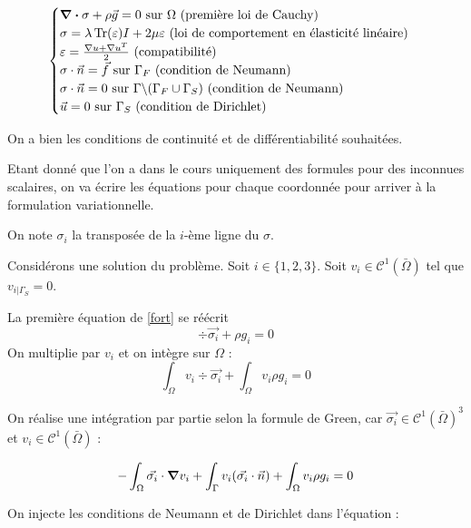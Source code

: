 \begin{equation}\label{fort}
    \begin{cases}
      \div \sigma + \rho \vec{g} = 0 \textrm { sur $\Omega$ (première loi de Cauchy)} \\
      \sigma = \lambda \operatorname{Tr} (\varepsilon) I + 2 \mu \varepsilon \textrm { (loi de comportement en élasticité linéaire)} \\
      \varepsilon=\frac{\nabla u + \nabla u^T }{2} \textrm { (compatibilité)} \\
      \sigma \cdot \vec{n} = \vec{f}\textrm { sur $\Gamma_F$ (condition de Neumann)} \\
      \sigma \cdot \vec{n} = 0\textrm { sur $\Gamma \backslash (\Gamma_F \cup \Gamma_S) $ (condition de Neumann)} \\
      \vec{u} = 0 \textrm { sur $\Gamma_S$ (condition de Dirichlet)} \\
      
    \end{cases}
\end{equation}

On a bien les conditions de continuité et de différentiabilité souhaitées. %

Etant donné que l'on a dans le cours uniquement des formules pour des inconnues scalaires, on va écrire les équations pour chaque coordonnée pour arriver à la formulation variationnelle.

On note $\sigma_i$ la transposée de la $i$-ème ligne du $\sigma$.

Considérons une solution du problème.
Soit $i \in \{1,2,3\}$.
Soit $v_i \in \mathcal{C}^1(\bar{\Omega})$ tel que $v_{i|\Gamma_S} = 0$.


La première équation de \eqref{fort} se réécrit 
$$\div \vec{\sigma_i} + \rho g_i = 0$$
On multiplie par $v_i$ et on intègre sur $\Omega$ :
$$\int_\Omega v_i \div \vec{\sigma_i} +  \int_\Omega v_i \rho g_i = 0$$

On réalise une intégration par partie selon la formule de Green, car $\vec{\sigma_i} \in \mathcal{C}^1(\bar{\Omega})^3$ et $v_i \in \mathcal{C}^1(\bar{\Omega})$ :


\begin{equation}\label{green}
    -\int_{\Omega} \vec{\sigma_i} \cdot \grad v_i + \int_{\Gamma} v_i (\vec{\sigma_i} \cdot \vec{n}) + \int_\Omega v_i \rho g_i = 0
\end{equation}

On injecte les conditions de Neumann et de Dirichlet dans l'équation : %

